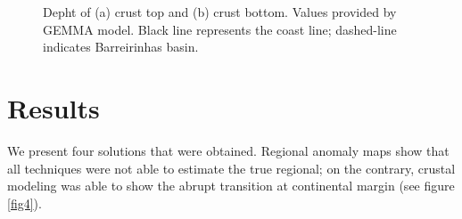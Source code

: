 \documentclass{sciposter}
\begin{document}
\begin{multicols}{3}
	\begin{figure}[ht!]
	\begin{center}
	\end{center}
	\caption{Depht of (a) crust top and (b) crust bottom. Values provided by GEMMA model. Black line represents the coast line; dashed-line indicates Barreirinhas basin.}
	\label{fig3}
	\end{figure}
	
	\section*{\large Results}
	We present four solutions that were obtained. Regional anomaly maps show that all techniques were not able to estimate the true regional; on the contrary, crustal modeling was able to show the abrupt transition at continental margin (see figure \ref{fig4}).
	

\end{multicols}
\end{document}
